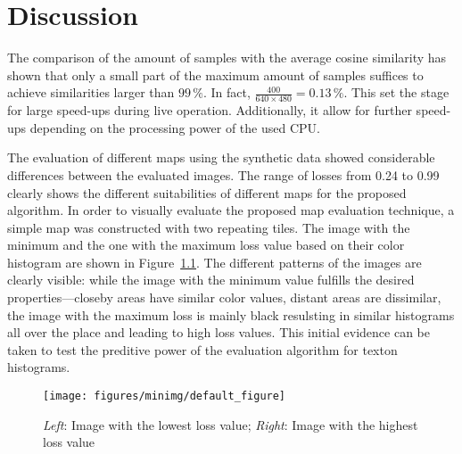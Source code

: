\chapter{Discussion}
\label{chap:discussion}

The comparison of the amount of samples with the average cosine
similarity has shown that only a small part of the maximum amount of
samples suffices to achieve similarities larger than $99\,\%$. In
fact, $\frac{400}{640 \times 480} = 0.13\,\%$. This set the stage for
large speed-ups during live operation. Additionally, it allow for further speed-ups depending on the processing power of the used
CPU.

The evaluation of different maps using the synthetic data showed
considerable differences between the evaluated images. The range of
losses from 0.24 to 0.99 clearly shows the different suitabilities of different maps for the proposed algorithm. In order to visually evaluate the
proposed map evaluation technique, a simple map was constructed with
two repeating tiles. The image with the minimum and the one with the
maximum loss value based on their color histogram are shown in
Figure~\ref{fig:minmaximg}. The different patterns of the images are
clearly visible: while the image with the minimum value fulfills the
desired properties---closeby areas have similar color values, distant
areas are dissimilar, the image with the maximum loss is mainly black
resulsting in similar histograms all over the place and leading to
high loss values. This initial evidence can be taken to test the
preditive power of the evaluation algorithm for texton histograms.

\begin{figure}[h!]
\begin{center}
\texttt{[image: figures/minimg/default\_figure]}
\caption{{\label{fig:minmaximg} \emph{Left}: Image with the lowest loss value; \emph{Right}:
    Image with the highest loss value%
}}
\end{center}
\end{figure}

